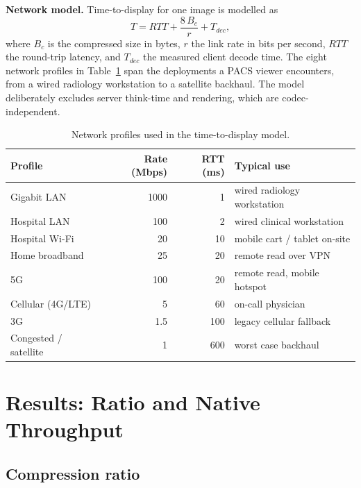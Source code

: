 \documentclass[journal]{IEEEtran}
\begin{document}
\textbf{Network model.}
\label{sec:netmodel}
Time-to-display for one image is modelled as
\begin{equation}
T = \mathit{RTT} + \frac{8\,B_c}{r} + T_{\mathit{dec}},
\label{eq:ttd}
\end{equation}
where $B_c$ is the compressed size in bytes, $r$ the link rate in bits per
second, $\mathit{RTT}$ the round-trip latency, and $T_{\mathit{dec}}$ the
measured client decode time. The eight network profiles in
Table~\ref{tab:netprofiles} span the deployments a PACS viewer encounters,
from a wired radiology workstation to a satellite backhaul. The model
deliberately excludes server think-time and rendering, which are
codec-independent.

\begin{table}[htbp]
\centering
\caption{Network profiles used in the time-to-display model.}
\label{tab:netprofiles}
\scriptsize
\begin{tabular}{lrrl}
\toprule
Profile & Rate (Mbps) & RTT (ms) & Typical use \\
\midrule
Gigabit LAN       & 1000 & 1   & wired radiology workstation \\
Hospital LAN      & 100  & 2   & wired clinical workstation \\
Hospital Wi-Fi    & 20   & 10  & mobile cart / tablet on-site \\
Home broadband    & 25   & 20  & remote read over VPN \\
5G                & 100  & 20  & remote read, mobile hotspot \\
Cellular (4G/LTE) & 5    & 60  & on-call physician \\
3G                & 1.5  & 100 & legacy cellular fallback \\
Congested / satellite & 1 & 600 & worst case backhaul \\
\bottomrule
\end{tabular}
\end{table}

\section{Results: Ratio and Native Throughput}
\label{sec:results}

\subsection{Compression ratio}
\end{document}
